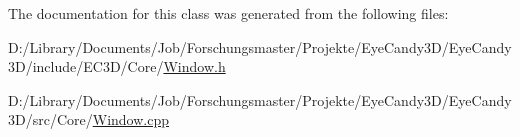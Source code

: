 The documentation for this class was generated from the following files\+:\begin{DoxyCompactItemize}
\item 
D\+:/\+Library/\+Documents/\+Job/\+Forschungsmaster/\+Projekte/\+Eye\+Candy3\+D/\+Eye\+Candy3\+D/include/\+E\+C3\+D/\+Core/\mbox{\hyperlink{_core_2_window_8h}{Window.\+h}}\item 
D\+:/\+Library/\+Documents/\+Job/\+Forschungsmaster/\+Projekte/\+Eye\+Candy3\+D/\+Eye\+Candy3\+D/src/\+Core/\mbox{\hyperlink{_core_2_window_8cpp}{Window.\+cpp}}\end{DoxyCompactItemize}
